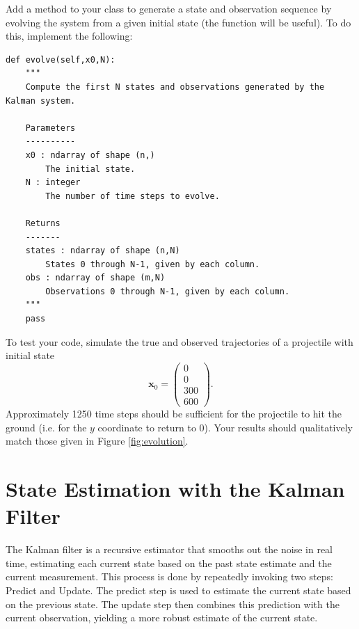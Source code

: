 \begin{problem}
Add a method to your  class to generate a state and observation sequence by evolving the system from a given initial state (the function  will be useful).
To do this, implement the following:
\begin{lstlisting}
def evolve(self,x0,N):
    """
    Compute the first N states and observations generated by the Kalman system.

    Parameters
    ----------
    x0 : ndarray of shape (n,)
        The initial state.
    N : integer
        The number of time steps to evolve.

    Returns
    -------
    states : ndarray of shape (n,N)
        States 0 through N-1, given by each column.
    obs : ndarray of shape (m,N)
        Observations 0 through N-1, given by each column.
    """
    pass
\end{lstlisting}

\noindent To test your code, simulate the true and observed trajectories of a projectile with initial state
\begin{equation*}
    \mathbf{x}_0 = \left( \begin{array}{c} 0\\ 0 \\ 300 \\ 600\end{array} \right).
\end{equation*}
Approximately 1250 time steps should be sufficient for the projectile to hit the ground (i.e. for the $y$ coordinate to return to 0).
Your results should qualitatively match those given in Figure \ref{fig:evolution}.
\label{prob:simulation}
\end{problem}



\section*{State Estimation with the Kalman Filter}
The Kalman filter is a recursive estimator that smooths out the noise in real time, estimating each current state based on the past state estimate and the current measurement.
This process is done by repeatedly invoking two steps: Predict and Update.
The predict step is used to estimate the current state based on the previous state.
The update step then combines this prediction with the current observation, yielding a more robust estimate of the current state.


